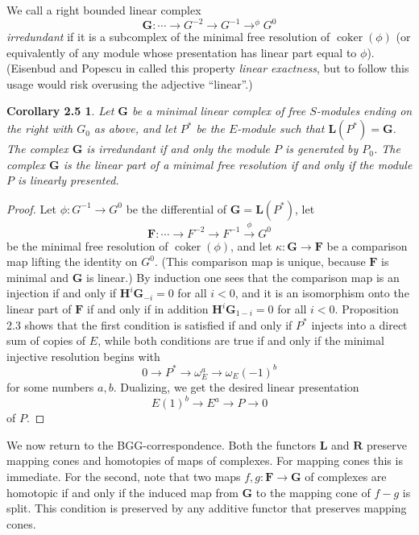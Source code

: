 \documentclass{tran-l}
\newcommand{\coker}{\operatorname{coker}}
\newcommand{\FF}{\mathbf{F}}
\newcommand{\GG}{\mathbf{G}}
\newcommand{\myH}{\mathbf{H}}
\newcommand{\LL}{\mathbf{L}}
\newcommand{\RR}{\mathbf{R}}
\theoremstyle{plain}
\newtheorem*{theorem7}{Corollary 2.5}
\theoremstyle{remark}
\theoremstyle{definition}
\begin{document}
We call a right bounded linear complex
\begin{equation*}\GG : \cdots \to G^{-2}\to G^{-1}\to ^{\phi } G^{0}
\end{equation*}
{\em irredundant\/} if it is a subcomplex of the
minimal free resolution of $\coker (\phi )$ (or equivalently of
any module whose presentation has linear part equal to $\phi $).
(Eisenbud and Popescu in \cite{EPo} called this property {\em linear exactness\/},
but to follow this usage would risk overusing the adjective
``linear''.)
\begin{theorem7}
Let $\GG $ be a minimal linear complex of
free $S$-modules ending on the right with $G_{0}$ as above,  and let
$P^{*}$ be the
$E$-module such that
$\LL (P^{*})=\GG $. The complex $\GG $ is
irredundant if and only the module $P$ is generated by $P_{0}$.
The complex $\GG $ is the linear part of a minimal free resolution
if and only if the module $P$ is linearly presented.
\end{theorem7}
\begin{proof} 
Let $\phi : G^{-1}\to G^{0}$ be the differential of $\GG =\LL (P^{*})$, let
\begin{equation*}\FF : \cdots \to F^{-2}\to F^{-1}\overset {\phi }{\longrightarrow }G^{0}
\end{equation*}
be the minimal free resolution of $\coker (\phi )$,
and let $\kappa :\GG \to \FF $ be a comparison map lifting the
identity on $G^{0}$.
(This comparison map is unique,
because $\FF $ is minimal and $\GG $ is linear.) By induction
one sees that the comparison map is an
injection if and only if $\myH ^{i}\GG _{-i}=0$ for all $i<0$,
and it is an isomorphism onto the linear part of $\FF $ if and
only if in addition $\myH ^{i}\GG _{1-i}=0$ for all $i<0$.
Proposition 2.3 shows that the first condition is
satisfied if and only if $P^{*}$ injects into a direct sum
of copies of $E$, while both conditions are true if and only
if the minimal injective resolution begins with
\begin{equation*}0\to P^{*}\to \omega _{E}^{a}\to \omega _{E}(-1)^{b}
\end{equation*}
for some numbers $a,b$. Dualizing, we get the desired linear presentation
\begin{equation*}E(1)^{b} \to E^{a} \to P \to 0 \end{equation*}
of $P$.
\end{proof}


We now return to the BGG-correspondence.
Both the functors $\LL $ and $\RR $ preserve
mapping cones and homotopies of maps of complexes. For mapping cones
this is immediate. For the second, note that two maps
$f,g:\FF \to \GG $
of complexes are homotopic if and only if the induced map
from $\GG $ to the mapping cone of
$f-g$ is split. This condition is preserved by any additive functor
that preserves mapping cones.
\end{document}
